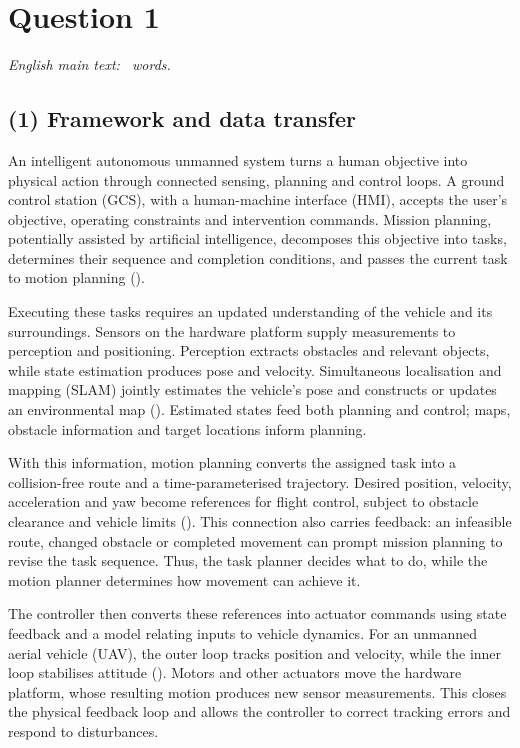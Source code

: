 \section*{Question 1}
\noindent\textit{English main text: \QoneWords\ words.}
\subsection*{(1) Framework and data transfer}
An intelligent autonomous unmanned system turns a human objective into physical action through connected sensing, planning and control loops. A ground control station (GCS), with a human-machine interface (HMI), accepts the user's objective, operating constraints and intervention commands. Mission planning, potentially assisted by artificial intelligence, decomposes this objective into tasks, determines their sequence and completion conditions, and passes the current task to motion planning (\citealp[pp. 21-22]{Chen2022}).

Executing these tasks requires an updated understanding of the vehicle and its surroundings. Sensors on the hardware platform supply measurements to perception and positioning. Perception extracts obstacles and relevant objects, while state estimation produces pose and velocity. Simultaneous localisation and mapping (SLAM) jointly estimates the vehicle's pose and constructs or updates an environmental map (\citealp{Cadena2016}). Estimated states feed both planning and control; maps, obstacle information and target locations inform planning.

With this information, motion planning converts the assigned task into a collision-free route and a time-parameterised trajectory. Desired position, velocity, acceleration and yaw become references for flight control, subject to obstacle clearance and vehicle limits (\citealp{Mellinger2011}). This connection also carries feedback: an infeasible route, changed obstacle or completed movement can prompt mission planning to revise the task sequence. Thus, the task planner decides what to do, while the motion planner determines how movement can achieve it.

The controller then converts these references into actuator commands using state feedback and a model relating inputs to vehicle dynamics. For an unmanned aerial vehicle (UAV), the outer loop tracks position and velocity, while the inner loop stabilises attitude (\citealp[p. 20]{Chen2022}). Motors and other actuators move the hardware platform, whose resulting motion produces new sensor measurements. This closes the physical feedback loop and allows the controller to correct tracking errors and respond to disturbances.

